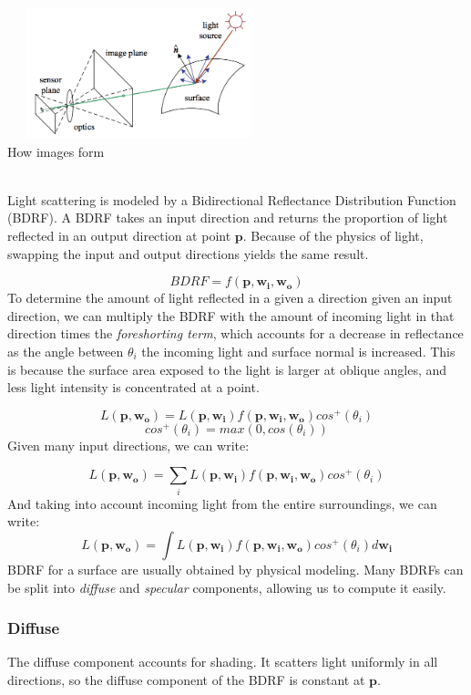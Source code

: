 \documentclass{article}
\let\vec\mathbf
\begin{document}
\begin{center}
    \includegraphics[height=1.5in, width=3in]{L1F2}\\ 
    \caption{How images form}
\end{center}
\\
Light scattering is modeled by a Bidirectional Reflectance Distribution Function (BDRF). A BDRF takes an input direction and returns the proportion of light reflected in an output direction at point $\vec{p}$. Because of the physics of light, swapping the input and output directions yields the same result.

$$ BDRF = f(\vec{p},\vec{w_i},\vec{w_o}) $$ 
\noindent 
To determine the amount of light reflected in a given a direction given an input direction, we can multiply the BDRF with the amount of incoming light in that direction times the \textit{foreshorting term}, which accounts for a decrease in reflectance as the angle between $\theta_i$ the incoming light and surface normal is increased. This is because the surface area exposed to the light is larger at oblique angles, and less light intensity is concentrated at a point.

$$ L(\vec{p},\vec{w_o}) = L(\vec{p},\vec{w_i})f(\vec{p},\vec{w_i},\vec{w_o})cos^+(\theta_i)$$
$$ cos^+(\theta_i) = max(0, cos(\theta_i))$$
\noindent
Given many input directions, we can write:

$$ L(\vec{p},\vec{w_o}) = \sum_{i} L(\vec{p},\vec{w_i})f(\vec{p},\vec{w_i},\vec{w_o})cos^+(\theta_i)$$
 \noindent
And taking into account incoming light from the entire surroundings, we can write:
$$ L(\vec{p},\vec{w_o}) = \int L(\vec{p},\vec{w_i})f(\vec{p},\vec{w_i},\vec{w_o})cos^+(\theta_i)d\vec{w_i}$$
\noindent
BDRF for a surface are usually obtained by physical modeling. Many BDRFs can be split into \textit{diffuse} and \textit{specular} components, allowing us to compute it easily.

\subsubsection{Diffuse}
The diffuse component accounts for shading. It scatters light uniformly  in all directions, so the diffuse component of the BDRF is constant at $\vec{p}$.
\end{document}
